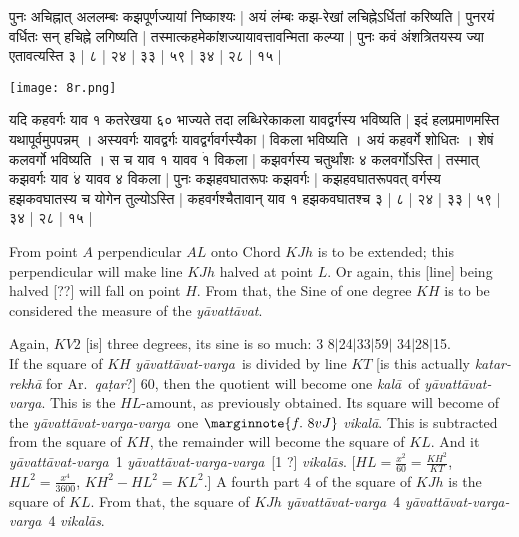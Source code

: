 \documentclass[12pt]{book}
\let\*=\d
\def\kala{\textit{ka\-l\=a}}
\def\ya{\textit{y\=avat\-t\=avat}}
\def\yava{\textit{y\=avat\-t\=avat-varga}}
\def\yavava{\textit{y\=avat\-t\=avat-varga-varga}}
\def\vikala{\textit{vi\-ka\-l\=a}}
\def\vikalas{\textit{vi\-ka\-l\=as}}
\def\danda{$|$}
\begin{document}
\newpage

{\s पुनः अचिह्नात् अललम्बः कझपूर्णज्यायां निष्काश्यः | अयं लंम्बः कझ-रेखां लचिह्नेऽर्धितां करिष्यति |
पुनरयं वर्धितः सन् हचिह्ने लगिष्यति | तस्मात्कहमेकांशज्यायावत्तावन्मिता कल्प्या | पुनः कवं अंशत्रितयस्य ज्या एतावत्यस्ति ३ | ८ | २४ | ३३ | ५९ | ३४ | २८ | १५ |} \\

\begin{center}
\texttt{[image: 8r.png]}
\end{center}

{\s यदि कहवर्गः याव १ कतरेखया ६० भाज्यते तदा लब्धिरेकाकला यावद्वर्गस्य भविष्यति | इदं हलप्रमाणमस्ति यथापूर्वमुपपन्नम् । अस्यवर्गः यावद्वर्गः यावद्वर्गवर्गस्यैका $|$
विकला भविष्यति । अयं कहवर्गे शोधितः । शेषं कलवर्गो भविष्यति । स च याव १ यावव $\dot{१}$ विकला | कझवर्गस्य चतुर्थांशः ४ 
कलवर्गोऽस्ति | तस्मात् कझवर्गः याव $\dot{४}$ यावव ४ विकला | पुनः कझहवघातरूपः
कझवर्गः | कझहवघातरूपवत् वर्गस्य हझकवघातस्य च योगेन तुल्योऽस्ति |
कहवर्गश्चैतावान् याव १ हझकवघातश्च ३ | ८ | २४ | ३३ | ५९ | ३४ | २८ | १५ |}

\newpage

From point $A$ perpendicular $AL$ onto Chord $KJh$ is to be extended; this perpendicular 
will make line $KJh$ halved at point $L$. Or again, this [line] being halved [??] will fall on point $H$.
From that, the Sine of one degree $KH$ is to be considered the measure of the \ya. 

Again, $KV2$ [is] three degrees, its sine is so much: 3 8\danda 24\danda 33\danda 59\danda
34\danda 28\danda 15. \\ 

\iffalse 
\begin{center}
\texttt{[image: 8r.png]}
\captionof{figure}{8r}
\end{center}
\fi 

If the square of $KH$ \yava\ is divided by line $KT$ [is this actually 
\textit{katar-rekh\=a} for Ar.\ \textit{qa\*tar}?] 60, then the quotient  will become
one \kala\ of \yava.   This is the $HL$-amount, as previously obtained. Its square
will become of the \yavava\ one
$\marginnote{f.~8v J}$
\vikala. This is subtracted from the square of $KH$, the remainder will become the
square of $KL$.  And it \yava\ 1  \yavava\ [1 ?] \vikalas. 
[$HL = \frac{x^2}{60} = \frac{KH^2}{KT}$, $HL^2 = \frac{x^4}{3600}$,
$KH^2 - HL^2 = KL^2$.]
A fourth part 4 of the square of $KJh$  is the square of $KL$. From that, 
the square of $KJh$ \yava\ 4 \yavava\ 4 \vikalas. 
\end{document}
